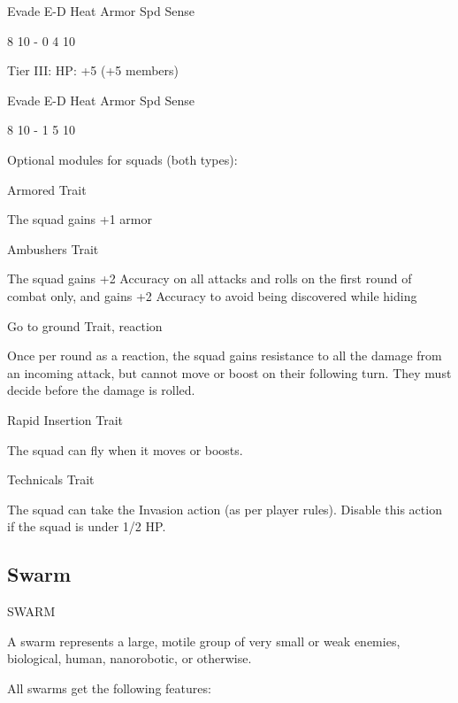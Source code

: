        Evade    E-D    Heat    Armor       Spd      Sense 

                                                                                                           


        8         10     -        0            4         10 

Tier III:  
HP: +5 (+5 members)
 

        Evade     E-D    Heat    Armor         Spd      Sense 

        8         10     -        1            5         10 

Optional modules for squads (both types): 
 
Armored  
Trait
 
The squad gains +1 armor
 

Ambushers  
Trait
 
The squad gains +2 Accuracy on all attacks and rolls on the first round of combat only, and gains  
+2 Accuracy to avoid being discovered while hiding
 

Go to ground  
Trait, reaction
 
Once per round as a reaction, the squad gains resistance to all the damage from an incoming  
attack, but cannot move or boost on their following turn. They must decide before the damage is  
rolled.
 

Rapid Insertion  
Trait
 
The squad can fly when it moves or boosts.
 

Technicals  
Trait
 
The squad can take the Invasion action (as per player rules). Disable this action if the squad is  
under 1/2 HP.
 

                                                                                                                    

\subsection{Swarm}
                                                   SWARM  

A swarm represents a large, motile group of very small or weak enemies, biological, human,  
nanorobotic, or otherwise.  

All swarms get the following features:
 
